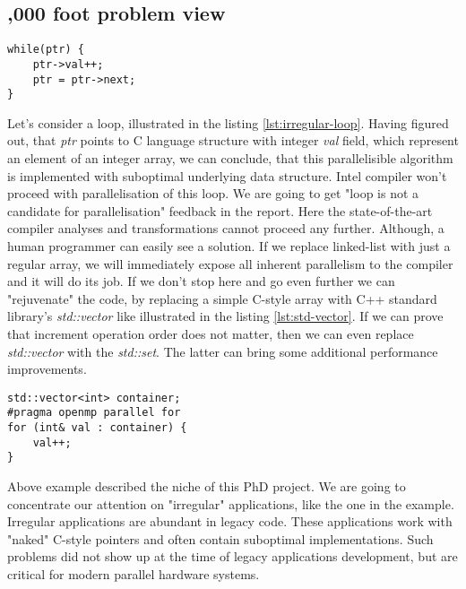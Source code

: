 \documentclass[12pt, a4paper]{article}
\begin{document}
\subsection*{,000 foot problem view}
\begin{lstlisting}[caption={Irregular loop. Parallelisible algorithm is hidden behind suboptimal implementation.}, captionpos=b, label=lst:irregular-loop, float,floatplacement=H]
while(ptr) {
	ptr->val++;
	ptr = ptr->next;
}
\end{lstlisting}
\qquad Let's consider a loop, illustrated in the listing \ref{lst:irregular-loop}. Having figured out, that \textit{ptr} points to C language structure with integer \textit{val} field, which represent an element of an integer array, we can conclude, that this parallelisible algorithm is implemented with suboptimal underlying data structure. Intel compiler won't proceed with parallelisation of this loop. We are going to get "loop is not a candidate for parallelisation" feedback in the report.\newline 
\null\qquad Here the state-of-the-art compiler analyses and transformations cannot proceed any further. Although, a human programmer can easily see a solution. If we replace linked-list with just a regular array, we will immediately expose all inherent parallelism to the compiler and it will do its job. If we don't stop here and go even further we can "rejuvenate" the code, by replacing a simple C-style array with C++ standard library's \textit{std::vector} like illustrated in the listing \ref{lst:std-vector}. If we can prove that increment operation order does not matter, then we can even replace \textit{std::vector} with the \textit{std::set}. The latter can bring some additional performance improvements.     
\begin{lstlisting}[caption={Linked-list based array in listing \ref{lst:irregular-loop} has been replaced with C++ STL vector. Now we can parallelise the loop manually. Intel compiler can do that automatically as well.}, captionpos=b, label=lst:std-vector, float,floatplacement=H]
std::vector<int> container;
#pragma openmp parallel for
for (int& val : container) {
	val++;
}
\end{lstlisting}\newline
\null\qquad Above example described the niche of this PhD project. We are going to concentrate our attention on "irregular" applications, like the one in the example. Irregular applications are abundant in legacy code. These applications work with "naked" C-style pointers and often contain suboptimal implementations. Such problems did not show up at the time of legacy applications development, but are critical for modern parallel hardware systems.
\end{document}
